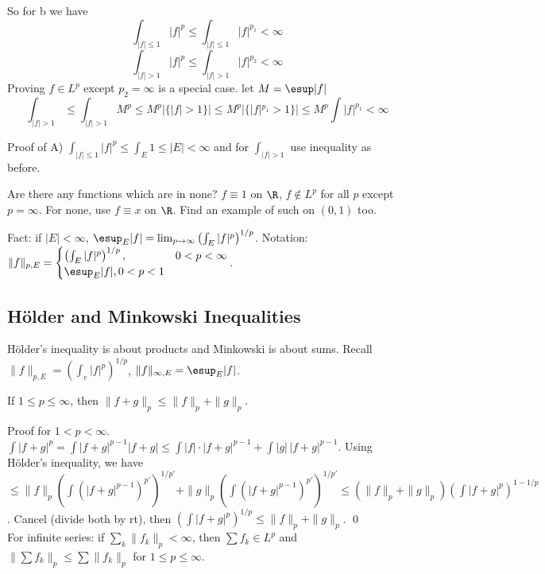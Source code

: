 So for b we have
	\[
	\int_{|f| \leq 1} |f|^p \leq \int_{|f| \leq 1} |f|^{p_1} < \infty
	\]
	\[
	\int_{|f|>1} |f|^p \leq \int_{|f|>1} |f|^{p_2} < \infty
	\]
Proving $f \in L^p$ except $p_2=\infty$ is a special case. let $M= \esup |f|$ 
	\[
	\int_{|f|>1} \leq \int_{|f|>1} M^p \leq M^p |\{|f|>1\}| \leq M^p |\{|f|^{p_1}>1\}| \leq M^p \int |f|^{p_1} < \infty
	\]


Proof of A) $\int_{|f| \leq 1} |f|^p \leq \int_E 1 \leq |E|<\infty$ and for $\int_{|f|>1}$ use inequality as before. 




Are there any functions which are in none? $f \equiv 1$ on $\R$, $f \notin L^p$ for all $p$ except $p=\infty$. For none, use $f \equiv x$ on $\R$. Find an example of such on $(0,1)$ too. 




Fact: if $|E|<\infty$, $\esup_E |f|= \lim_{p \to \infty} \left( \int_E |f|^p\right)^{1/p}$. Notation: $\|f\|_{p,E}= \begin{cases} \left( \int_E |f|^p\right)^{1/p}, & 0<p<\infty \\ \esup_E |f|, 0<p<1 \end{cases}$. 



\subsection{H\"older and Minkowski Inequalities}


H\"older's inequality is about products and Minkowski is about sums. Recall $\|f\|_{p,E}= \left( \int_e |f|^p \right)^{1/p}$, $\|f\|_{\infty,E}= \esup_E |f|$. 


\begin{thm}
If $1 \leq p \leq \infty$, then $\|f+g\|_p \leq \|f\|_p + \|g\|_p$. 
\end{thm}

\pf Proof for $1<p<\infty$. $\int |f+g|^p= \int |f+g|^{p-1} |f+g| \leq \int |f| \cdot |f+g|^{p-1} + \int |g| \, |f+g|^{p-1}$. Using H\"older's inequality, we have $\leq \|f\|_p \left( \int (|f+g|^{p-1})^{p'} \right)^{1/p'} + \|g\|_p \left( \int (|f+g|^{p-1})^{p'}\right)^{1/p'} \leq (\|f\|_p + \|g\|_p) \left( \int |f+g|^p \right)^{1-1/p}$. Cancel (divide both by rt), then $\left( \int |f+g|^p \right)^{1/p} \leq \|f\|_p + \|g\|_p$. \qed \\


For infinite series: if $\sum_k \|f_k\|_p < \infty$, then $\sum f_k \in L^p$ and $\| \sum f_k \|_p \leq \sum \|f_k\|_p$ for $1 \leq p \leq \infty$. 

